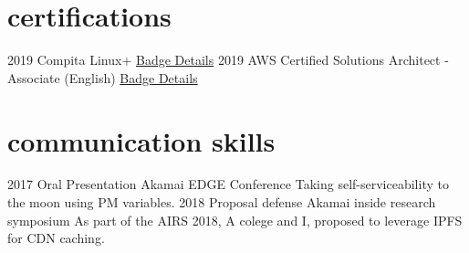 \documentclass[]{friggeri-cv}
\begin{document}

\section{certifications}

\begin{entrylist}
	\entry
	{2019}
	{Compita Linux+}
	{\href{https://www.youracclaim.com/badges/e0a369ba-bf60-4445-97be-49b9d14a61e2}{Badge Details}}
	{}
	\entry
	{2019}
	{AWS Certified Solutions Architect - Associate (English)}
	{\href{https://www.certmetrics.com/amazon/public/badge.aspx?i=1&t=c&d=2019-03-14&ci=AWS00644145}{Badge Details}}
	{}
\end{entrylist}


\section{communication skills}

\begin{entrylist}
\entry
{2017}
{Oral Presentation}
{Akamai EDGE Conference}
{Taking self-serviceability to the moon using PM variables.}
\entry
{2018}
{Proposal defense}
{Akamai inside research symposium}
{As part of the AIRS 2018, A colege and I, proposed to leverage IPFS for CDN caching.}
\end{entrylist}

% 
\end{document}
